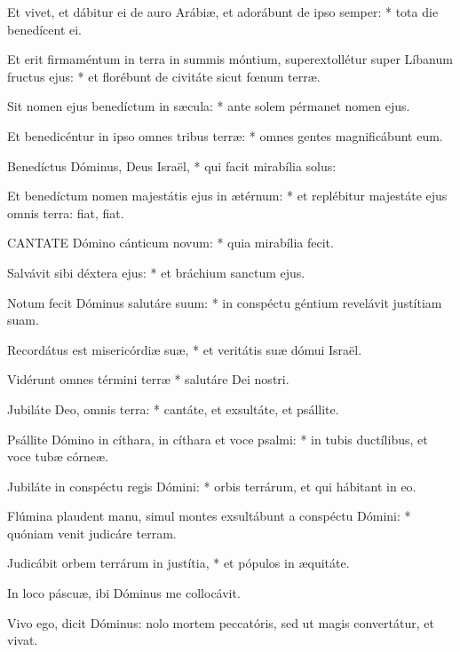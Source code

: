 Et vivet, et dábitur ei de auro Arábiæ, et adorábunt de ipso semper: * tota die benedícent ei.

Et erit firmaméntum in terra in summis móntium, superextollétur super Líbanum fructus ejus: * et florébunt de civitáte sicut fœnum terræ.

Sit nomen ejus benedíctum in sæcula: * ante solem pérmanet nomen ejus.

Et benedicéntur in ipso omnes tribus terræ: * omnes gentes magnificábunt eum.

Benedíctus Dóminus, Deus Israël, * qui facit mirabília solus:

Et benedíctum nomen majestátis ejus in ætérnum: * et replébitur majestáte ejus omnis terra: fiat, fiat.



\lettrine[lines=2]{C}{ANTATE} Dómino cánticum novum: * quia mirabília fecit.

Salvávit sibi déxtera ejus: * et bráchium sanctum ejus.

Notum fecit Dóminus salutáre suum: * in conspéctu géntium revelávit justítiam suam.

Recordátus est misericórdiæ suæ, * et veritátis suæ dómui Israël.

Vidérunt omnes términi terræ * salutáre Dei nostri.

Jubiláte Deo, omnis terra: * cantáte, et exsultáte, et psállite.

Psállite Dómino in cíthara, in cíthara et voce psalmi: * in tubis ductílibus, et voce tubæ córneæ.

Jubiláte in conspéctu regis Dómini: * orbis terrárum, et qui hábitant in eo.

Flúmina plaudent manu, simul montes exsultábunt a conspéctu Dómini: * quóniam venit judicáre terram.

Judicábit orbem terrárum in justítia, * et pópulos in æquitáte.


  In loco páscuæ, ibi Dóminus me collocávit.



 Vivo ego, dicit Dóminus: nolo mortem peccatóris, sed ut magis convertátur, et vivat.


